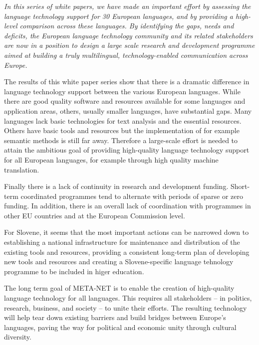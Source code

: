 \begin{multicols}{2}
\emph{In this series of white papers, we have made an important effort by assessing the language technology support for 30 European languages, and by providing a high-level comparison across these languages. By identifying the gaps, needs and deficits, the European language technology community and its related stakeholders are now in a position to design a large scale research and development programme aimed at building a truly multilingual, technology-enabled communication across Europe.}

The results of this white paper series show that there is a dramatic difference in language technology support between the various European languages. While there are good quality software and resources available for some languages and application areas, others, usually smaller languages, have substantial gaps. Many languages lack basic technologies for text analysis and the essential resources. Others have basic tools and resources but the implementation of for example semantic methods is still far away. Therefore a large-scale effort is needed to attain the ambitious goal of providing high-quality language technology support for all European languages, for example through high quality machine translation. 

Finally there is a lack of continuity in research and development funding. Short-term coordinated programmes tend to alternate with periods of sparse or zero funding. In addition, there is an overall lack of coordination with programmes in other EU countries and at the European Commission level.

For Slovene, it seems that the most important actions can be narrowed down to establishing a national infrastructure for maintenance and distribution of the existing tools and resources, providing a consistent long-term plan of developing new tools and resources and creating a Slovene-specific language tehnology programme to be included in higer education.

The long term goal of META-NET is to enable the creation of high-quality language technology for all languages. This requires all stakeholders -- in politics, research, business, and society -- to unite their efforts. The resulting technology will help tear down existing barriers and build bridges between Europe’s languages, paving the way for political and economic unity through cultural diversity. 
\end{multicols}

\clearpage


